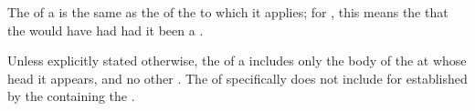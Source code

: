 % 
% 
% 
% 
% 

The  of a  is the same as the
of the  to which it applies;
for ,
this means the  that the  
would have had had it been a .

Unless explicitly stated otherwise, the  of a 
 includes only the body  of 
the  at whose head it appears, and no other .
The  of  specifically does not
include  for  established
by the  containing the .

